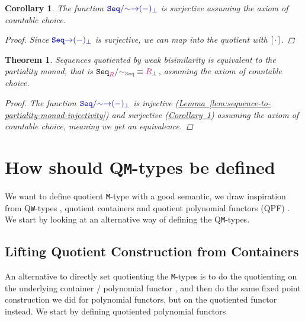 \documentclass[twoside,11pt,openright]{report}
\theoremstyle{plain} %
\newtheorem{thm}{Theorem}[section]
\newtheorem{cor}{Corollary}
\theoremstyle{definition}
\newtheorem{defn}[thm]{Definition}%
\theoremstyle{remark}
\newcommand*{\lemref}[1]{\hyperref[lem:#1]{Lemma~\ref*{lem:#1}}}
\newcommand*{\corref}[1]{\hyperref[cor:#1]{Corollary~\ref*{cor:#1}}}
\newcommand*{\term}[1]{\textcolor{green!30!black}{#1}} %
\newcommand*{\type}[1]{\textcolor{magenta!90!black}{#1}}
\newcommand*{\containerpair}[2]{\ensuremath{\colorlet{savedleftcolor}{.}\color{orange}\left(\color{savedleftcolor}#1\,\textcolor{orange}{\mathbf{,}}\,#2\color{orange}\right)\color{savedleftcolor}}}
\newcommand*{\universe}[1]{\textcolor{orange!80!black}{#1}}
\newcommand*{\relation}[1]{\textcolor{gray!75!black}{\ensuremath{\mathtt{#1}}}}
\newcommand*{\function}[1]{\textcolor{blue!60!black}{\ensuremath{\mathtt{#1}}}}
\newcommand*{\constructor}[1]{\textcolor{purple!60!black}{\ensuremath{\mathtt{#1}}}}
\newcommand*{\typeformer}[1]{\ensuremath{\mathtt{#1}}}
\newcommand*{\quotientconstructor}[1]{\constructor{[}\,#1\,\constructor{]}}
\begin{document}
\begin{cor}
  \label{cor:sequence-partiality-monad-surjective}
  The function \(\function{Seq/{\sim}{\rightarrow}(-)_{\bot}}\) is surjective assuming the axiom of countable choice.
  \begin{proof}
    Since \(\function{Seq{\rightarrow}(-)_{\bot}}\) is surjective, we can map into the quotient with \(\quotientconstructor{{\cdot}}\).
  \end{proof}
\end{cor}
\begin{thm}
  \label{thm:sequence-partiality-monad-eq}
  Sequences quotiented by weak bisimilarity is equivalent to the partiality monad, that is \(\typeformer{Seq}_{\type{R}} / \relation{\sim_{Seq}} \equiv \type{R}_{\bot}\), assuming the axiom of countable choice.
  \begin{proof}
 The function \(\function{Seq/{\sim}{\rightarrow}(-)_\bot}\) is injective (\lemref{sequence-to-partiality-monad-injectivity}) and surjective (\corref{sequence-partiality-monad-surjective}) assuming the axiom of countable choice, meaning we get an equivalence.
\end{proof}
\end{thm}

\section{How should Q\texttt{M}-types be defined}
We want to define quotient \texttt{M}-type with a good semantic, we draw inspiration from Q\texttt{W}-types \cite{DBLP:Constructing-QIITs}, quotient containers \cite{DBLP:quotient-container} and quotient polynomial functors (QPF) \cite{DBLP:QM-lean}. We start by looking at an alternative way of defining the Q\texttt{M}-types.

\subsection{Lifting Quotient Construction from Containers}
An alternative to directly set quotienting the \texttt{M}-types is to do the quotienting on the underlying container \cite{DBLP:quotient-container} / polynomial functor \cite{DBLP:QM-lean}, and then do the same fixed point construction we did for polynomial functors, but on the quotiented functor instead. We start by defining quotiented polynomial functors
    
\end{document}
